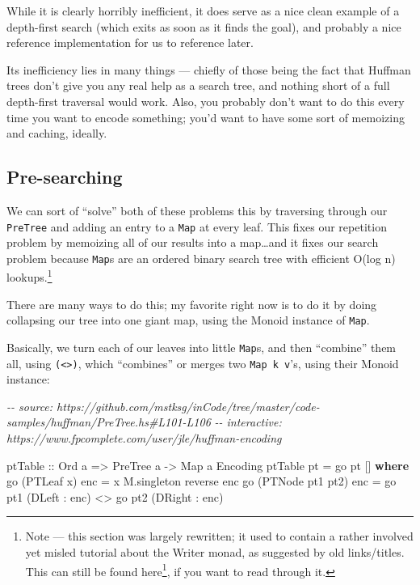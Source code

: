 \documentclass[]{article}
\newenvironment{Shaded}{}{}
\newcommand{\CommentTok}[1]{\textcolor[rgb]{0.38,0.63,0.69}{\textit{#1}}}
\newcommand{\DataTypeTok}[1]{\textcolor[rgb]{0.56,0.13,0.00}{#1}}
\newcommand{\FunctionTok}[1]{\textcolor[rgb]{0.02,0.16,0.49}{#1}}
\newcommand{\KeywordTok}[1]{\textcolor[rgb]{0.00,0.44,0.13}{\textbf{#1}}}
\newcommand{\NormalTok}[1]{#1}
\newcommand{\OperatorTok}[1]{\textcolor[rgb]{0.40,0.40,0.40}{#1}}
\newcommand{\OtherTok}[1]{\textcolor[rgb]{0.00,0.44,0.13}{#1}}
\renewcommand{\href}[2]{#2\footnote{\url{#1}}}
\begin{document}
While it is clearly horribly inefficient, it does serve as a nice clean example
of a depth-first search (which exits as soon as it finds the goal), and probably
a nice reference implementation for us to reference later.

Its inefficiency lies in many things --- chiefly of those being the fact that
Huffman trees don't give you any real help as a search tree, and nothing short
of a full depth-first traversal would work. Also, you probably don't want to do
this every time you want to encode something; you'd want to have some sort of
memoizing and caching, ideally.

\hypertarget{pre-searching}{%
\subsection{Pre-searching}\label{pre-searching}}

We can sort of ``solve'' both of these problems this by traversing through our
\texttt{PreTree} and adding an entry to a \texttt{Map} at every leaf. This fixes
our repetition problem by memoizing all of our results into a map\ldots and it
fixes our search problem because \texttt{Map}s are an ordered binary search tree
with efficient O(log n) lookups.\footnote{Note --- this section was largely
  rewritten; it used to contain a rather involved yet misled tutorial about the
  Writer monad, as suggested by old links/titles. This can
  \href{https://github.com/mstksg/inCode/blob/master/copy/entries/.huffman-2-writer.md}{still
  be found here}, if you want to read through it.}

There are many ways to do this; my favorite right now is to do it by doing
collapsing our tree into one giant map, using the Monoid instance of
\texttt{Map}.

Basically, we turn each of our leaves into little \texttt{Map}s, and then
``combine'' them all, using \texttt{(\textless{}\textgreater{})}, which
``combines'' or merges two \texttt{Map\ k\ v}'s, using their Monoid instance:

\begin{Shaded}
\begin{Highlighting}[]
\CommentTok{{-}{-} source: https://github.com/mstksg/inCode/tree/master/code{-}samples/huffman/PreTree.hs\#L101{-}L106}
\CommentTok{{-}{-} interactive: https://www.fpcomplete.com/user/jle/huffman{-}encoding}

\OtherTok{ptTable ::} \DataTypeTok{Ord}\NormalTok{ a }\OtherTok{=>} \DataTypeTok{PreTree}\NormalTok{ a }\OtherTok{{-}>} \DataTypeTok{Map}\NormalTok{ a }\DataTypeTok{Encoding}
\NormalTok{ptTable pt }\OtherTok{=}\NormalTok{ go pt []}
  \KeywordTok{where}
\NormalTok{    go (}\DataTypeTok{PTLeaf}\NormalTok{ x) enc       }\OtherTok{=}\NormalTok{ x }\OtherTok{\textasciigrave{}M.singleton\textasciigrave{}} \FunctionTok{reverse}\NormalTok{ enc}
\NormalTok{    go (}\DataTypeTok{PTNode}\NormalTok{ pt1 pt2) enc }\OtherTok{=}\NormalTok{ go pt1 (}\DataTypeTok{DLeft}  \OperatorTok{:}\NormalTok{ enc) }\OperatorTok{<>}
\NormalTok{                              go pt2 (}\DataTypeTok{DRight} \OperatorTok{:}\NormalTok{ enc)}
\end{Highlighting}
\end{Shaded}
\end{document}
